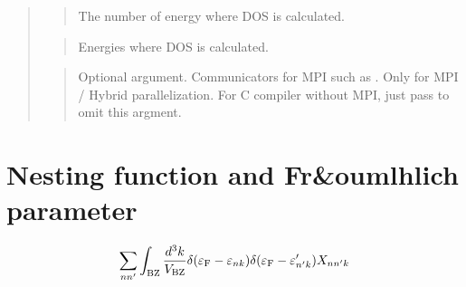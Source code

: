 \documentclass[letterpaper,10pt,pdftex,openany,english]{sphinxmanual}
\begin{document}
\begin{quote}
\begin{quote}
\sphinxAtStartPar
The number of energy where DOS is calculated.
\end{quote}

\begin{sphinxVerbatim}[commandchars=\\\{\}]
\end{sphinxVerbatim}
\begin{quote}

\sphinxAtStartPar
Energies where DOS is calculated.
\end{quote}

\begin{sphinxVerbatim}[commandchars=\\\{\}]
\end{sphinxVerbatim}
\begin{quote}

\sphinxAtStartPar
Optional argument. Communicators for MPI such as .
Only for MPI / Hybrid parallelization.
For C compiler without MPI, just pass  to omit this argment.
\end{quote}
\end{quote}


\section{Nesting function and Fr\&oumlhlich parameter}
\label{\detokenize{routine:nesting-function-and-fr-oumlhlich-parameter}}\begin{equation*}
\begin{split}\begin{align}
\sum_{n n'}
\int_{\rm BZ} \frac{d^3 k}{V_{\rm BZ}}
\delta(\varepsilon_{\rm F} -
\varepsilon_{n k}) \delta(\varepsilon_{\rm F} - \varepsilon'_{n' k})
X_{n n' k}
\end{align}\end{split}
\end{equation*}
\begin{sphinxVerbatim}[commandchars=\\\{\}]
\end{sphinxVerbatim}
\end{document}
